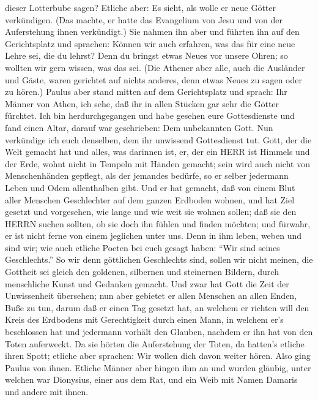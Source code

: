 dieser Lotterbube sagen? Etliche aber: Es sieht, als wolle er neue
Götter verkündigen. (Das machte, er hatte das Evangelium von Jesu und
von der Auferstehung ihnen verkündigt.)  Sie nahmen ihn
aber und führten ihn auf den Gerichtsplatz und sprachen: Können wir auch
erfahren, was das für eine neue Lehre sei, die du lehrst? 
Denn du bringst etwas Neues vor unsere Ohren; so wollten wir gern
wissen, was das sei.  (Die Athener aber alle, auch die
Ausländer und Gäste, waren gerichtet auf nichts anderes, denn etwas
Neues zu sagen oder zu hören.)  Paulus aber stand mitten
auf dem Gerichtsplatz und sprach: Ihr Männer von Athen, ich sehe, daß
ihr in allen Stücken gar sehr die Götter fürchtet.  Ich bin
herdurchgegangen und habe gesehen eure Gottesdienste und fand einen
Altar, darauf war geschrieben: Dem unbekannten Gott. Nun verkündige ich
euch denselben, dem ihr unwissend Gottesdienst tut.  Gott,
der die Welt gemacht hat und alles, was darinnen ist, er, der ein HERR
ist Himmels und der Erde, wohnt nicht in Tempeln mit Händen gemacht;
 sein wird auch nicht von Menschenhänden gepflegt, als der
jemandes bedürfe, so er selber jedermann Leben und Odem allenthalben
gibt.  Und er hat gemacht, daß von einem Blut aller
Menschen Geschlechter auf dem ganzen Erdboden wohnen, und hat Ziel
gesetzt und vorgesehen, wie lange und wie weit sie wohnen sollen;
 daß sie den HERRN suchen sollten, ob sie doch ihn fühlen
und finden möchten; und fürwahr, er ist nicht ferne von einem jeglichen
unter uns.  Denn in ihm leben, weben und sind wir; wie auch
etliche Poeten bei euch gesagt haben: ``Wir sind seines Geschlechts.''
 So wir denn göttlichen Geschlechts sind, sollen wir nicht
meinen, die Gottheit sei gleich den goldenen, silbernen und steinernen
Bildern, durch menschliche Kunst und Gedanken gemacht.  Und
zwar hat Gott die Zeit der Unwissenheit übersehen; nun aber gebietet er
allen Menschen an allen Enden, Buße zu tun,  darum daß er
einen Tag gesetzt hat, an welchem er richten will den Kreis des
Erdbodens mit Gerechtigkeit durch einen Mann, in welchem er's
beschlossen hat und jedermann vorhält den Glauben, nachdem er ihn hat
von den Toten auferweckt.  Da sie hörten die Auferstehung
der Toten, da hatten's etliche ihren Spott; etliche aber sprachen: Wir
wollen dich davon weiter hören.  Also ging Paulus von
ihnen.  Etliche Männer aber hingen ihm an und wurden
gläubig, unter welchen war Dionysius, einer aus dem Rat, und ein Weib
mit Namen Damaris und andere mit ihnen.

